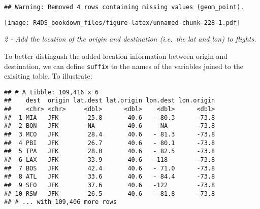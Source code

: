\documentclass[]{article}
\newenvironment{Shaded}{\begin{snugshade}}{\end{snugshade}}
\newcommand{\KeywordTok}[1]{\textcolor[rgb]{0.13,0.29,0.53}{\textbf{#1}}}
\newcommand{\DataTypeTok}[1]{\textcolor[rgb]{0.13,0.29,0.53}{#1}}
\newcommand{\StringTok}[1]{\textcolor[rgb]{0.31,0.60,0.02}{#1}}
\newcommand{\OperatorTok}[1]{\textcolor[rgb]{0.81,0.36,0.00}{\textbf{#1}}}
\newcommand{\NormalTok}[1]{#1}
\theoremstyle{definition}
\theoremstyle{definition}
\theoremstyle{definition}
\theoremstyle{remark}
\begin{document}
\begin{verbatim}
## Warning: Removed 4 rows containing missing values (geom_point).
\end{verbatim}

\texttt{[image: R4DS\_bookdown\_files/figure-latex/unnamed-chunk-228-1.pdf]}

\emph{2 - Add the location of the origin and destination (i.e.~the lat
and lon) to flights.}

To better distingush the added location information between origin and
destination, we can define \texttt{suffix} to the names of the variables
joined to the exisiting table. To illustrate:

\begin{Shaded}
\end{Shaded}

\begin{verbatim}
## # A tibble: 109,416 x 6
##    dest  origin lat.dest lat.origin lon.dest lon.origin
##    <chr> <chr>     <dbl>      <dbl>    <dbl>      <dbl>
##  1 MIA   JFK        25.8       40.6   - 80.3      -73.8
##  2 BQN   JFK        NA         40.6     NA        -73.8
##  3 MCO   JFK        28.4       40.6   - 81.3      -73.8
##  4 PBI   JFK        26.7       40.6   - 80.1      -73.8
##  5 TPA   JFK        28.0       40.6   - 82.5      -73.8
##  6 LAX   JFK        33.9       40.6   -118        -73.8
##  7 BOS   JFK        42.4       40.6   - 71.0      -73.8
##  8 ATL   JFK        33.6       40.6   - 84.4      -73.8
##  9 SFO   JFK        37.6       40.6   -122        -73.8
## 10 RSW   JFK        26.5       40.6   - 81.8      -73.8
## # ... with 109,406 more rows
\end{verbatim}
\end{document}
